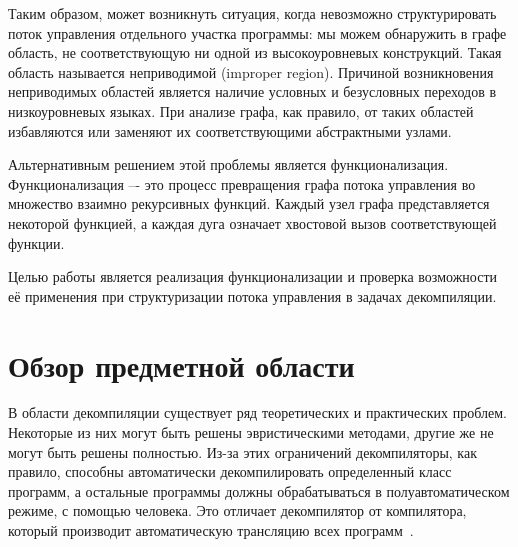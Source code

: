 Таким образом, может возникнуть ситуация, когда невозможно структурировать поток управления отдельного участка программы: мы можем обнаружить в графе область, не соответствующую ни одной из высокоуровневых конструкций. Такая область называется неприводимой (improper region). Причиной возникновения неприводимых областей является наличие условных и безусловных переходов в низкоуровневых языках. При анализе графа, как правило, от таких областей избавляются или заменяют их соответствующими абстрактными узлами.

Альтернативным решением этой проблемы является функционализация. Функционализация –- это процесс превращения графа потока управления во множество взаимно рекурсивных функций. Каждый узел графа представляется некоторой функцией, а каждая дуга означает хвостовой вызов соответствующей функции.

Целью работы является реализация функционализации и проверка возможности её применения при структуризации потока управления в задачах декомпиляции.



\section{Обзор предметной области}

В области декомпиляции существует ряд теоретических и практических проблем. Некоторые из них могут быть решены эвристическими методами, другие же не могут быть решены полностью. Из-за этих ограничений декомпиляторы, как правило, способны автоматически декомпилировать определенный класс программ, а остальные программы должны обрабатываться в полуавтоматическом режиме, с помощью человека. Это отличает декомпилятор от компилятора, который производит автоматическую трансляцию всех программ~\cite{decompilation}.

